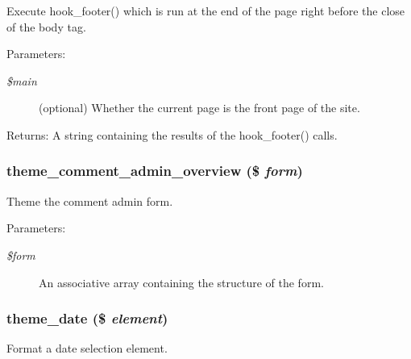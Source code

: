 Execute hook\_\-footer() which is run at the end of the page right before the close of the body tag.

\begin{Desc}
\item[Parameters:]
\begin{description}
\item[{\em \$main}](optional) Whether the current page is the front page of the site. \end{description}
\end{Desc}
\begin{Desc}
\item[Returns:]A string containing the results of the hook\_\-footer() calls. \end{Desc}
\hypertarget{group__themeable_g206b5909bfdb91cc12f8f10edadbf45d}{
\subsubsection[{theme\_\-comment\_\-admin\_\-overview}]{\setlength{\rightskip}{0pt plus 5cm}theme\_\-comment\_\-admin\_\-overview (\$ {\em form})}}
\label{group__themeable_g206b5909bfdb91cc12f8f10edadbf45d}


Theme the comment admin form.

\begin{Desc}
\item[Parameters:]
\begin{description}
\item[{\em \$form}]An associative array containing the structure of the form. \end{description}
\end{Desc}
\hypertarget{group__themeable_g88b275cc95a32c585d1e913cb63e1f1e}{
\subsubsection[{theme\_\-date}]{\setlength{\rightskip}{0pt plus 5cm}theme\_\-date (\$ {\em element})}}
\label{group__themeable_g88b275cc95a32c585d1e913cb63e1f1e}


Format a date selection element.


